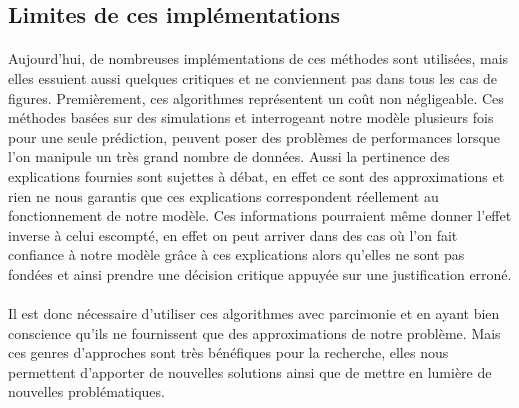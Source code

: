 \subsection{Limites de ces implémentations}
\paragraph{}Aujourd'hui, de nombreuses implémentations de ces méthodes sont utilisées, mais elles essuient aussi quelques critiques et ne conviennent pas dans tous les cas de figures. Premièrement, ces algorithmes représentent un coût non négligeable. Ces méthodes basées sur des simulations et interrogeant notre modèle plusieurs fois pour une seule prédiction, peuvent poser des problèmes de performances lorsque l'on manipule un très grand nombre de données. Aussi la pertinence des explications fournies sont sujettes à débat, en effet ce sont des approximations et rien ne nous garantis que ces explications correspondent réellement au fonctionnement de notre modèle. Ces informations pourraient même donner l'effet inverse à celui escompté, en effet on peut arriver dans des cas où l'on fait confiance à notre modèle grâce à ces explications alors qu'elles ne sont pas fondées et ainsi prendre une décision critique appuyée sur une justification erroné.

\paragraph{}Il est donc nécessaire d'utiliser ces algorithmes avec parcimonie et en ayant bien conscience qu'ils ne fournissent que des approximations de notre problème. Mais ces genres d'approches sont très bénéfiques pour la recherche, elles nous permettent d'apporter de nouvelles solutions ainsi que de mettre en lumière de nouvelles problématiques.

